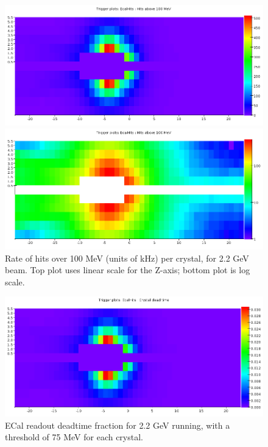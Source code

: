 \begin{figure}[ht]
	\includegraphics[width=\textwidth]{performance/ecal_rate_100mev_22}

	\includegraphics[width=\textwidth]{performance/ecal_rate_100mev_22_log}
	\caption{\small{Rate of hits over 100 MeV (units of kHz) per crystal, for 2.2 GeV beam. Top plot uses linear scale for the Z-axis; bottom plot is log scale.}}
	\label{fig:ecal_rate}
\end{figure}

\begin{figure}[ht]
	\includegraphics[width=\textwidth]{performance/ecal_deadtime_22}
	\caption{\small{ECal readout deadtime fraction for 2.2 GeV running, with a threshold of 75 MeV for each crystal.}}
	\label{fig:ecal_deadtime}
\end{figure}

